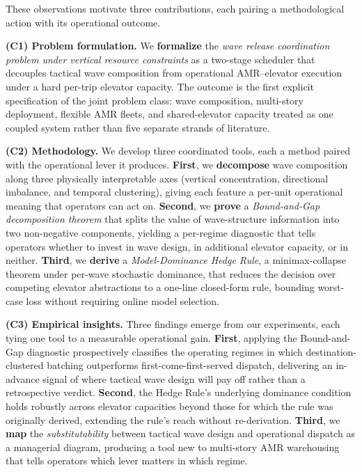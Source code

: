 \documentclass[11pt, a4paper]{article}
\begin{document}
These observations motivate three contributions, each pairing a methodological action with its operational outcome.

\textbf{(C1) Problem formulation.} We \textbf{formalize} the \emph{wave release coordination problem under vertical resource constraints} as a two-stage scheduler that decouples tactical wave composition from operational AMR--elevator execution under a hard per-trip elevator capacity. The outcome is the first explicit specification of the joint problem class: wave composition, multi-story deployment, flexible AMR fleets, and shared-elevator capacity treated as one coupled system rather than five separate strands of literature.

\textbf{(C2) Methodology.} We develop three coordinated tools, each a method paired with the operational lever it produces. \textbf{First}, we \textbf{decompose} wave composition along three physically interpretable axes (vertical concentration, directional imbalance, and temporal clustering), giving each feature a per-unit operational meaning that operators can act on. \textbf{Second}, we \textbf{prove} a \emph{Bound-and-Gap decomposition theorem} that splits the value of wave-structure information into two non-negative components, yielding a per-regime diagnostic that tells operators whether to invest in wave design, in additional elevator capacity, or in neither. \textbf{Third}, we \textbf{derive} a \emph{Model-Dominance Hedge Rule}, a minimax-collapse theorem under per-wave stochastic dominance, that reduces the decision over competing elevator abstractions to a one-line closed-form rule, bounding worst-case loss without requiring online model selection.

\textbf{(C3) Empirical insights.} Three findings emerge from our experiments, each tying one tool to a measurable operational gain. \textbf{First}, applying the Bound-and-Gap diagnostic prospectively classifies the operating regimes in which destination-clustered batching outperforms first-come-first-served dispatch, delivering an in-advance signal of where tactical wave design will pay off rather than a retrospective verdict. \textbf{Second}, the Hedge Rule's underlying dominance condition holds robustly across elevator capacities beyond those for which the rule was originally derived, extending the rule's reach without re-derivation. \textbf{Third}, we \textbf{map} the \emph{substitutability} between tactical wave design and operational dispatch as a managerial diagram, producing a tool new to multi-story AMR warehousing that tells operators which lever matters in which regime.
\end{document}
